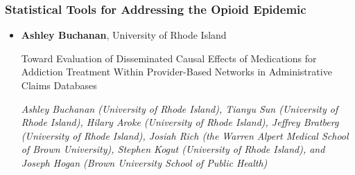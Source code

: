 \subsubsection*{Statistical Tools for Addressing the Opioid Epidemic}

\begin{itemize}
\item \textbf{Ashley Buchanan}, University of Rhode Island

Toward Evaluation of Disseminated Causal Effects of Medications for Addiction Treatment Within Provider-Based Networks in Administrative Claims Databases

\emph{\footnotesize Ashley Buchanan (University of Rhode Island), Tianyu Sun (University of Rhode Island), Hilary Aroke (University of Rhode Island), Jeffrey Bratberg (University of Rhode Island), Josiah Rich (the Warren Alpert Medical School of Brown University), Stephen Kogut (University of Rhode Island), and Joseph Hogan (Brown University School of Public Health)}


\end{itemize}
